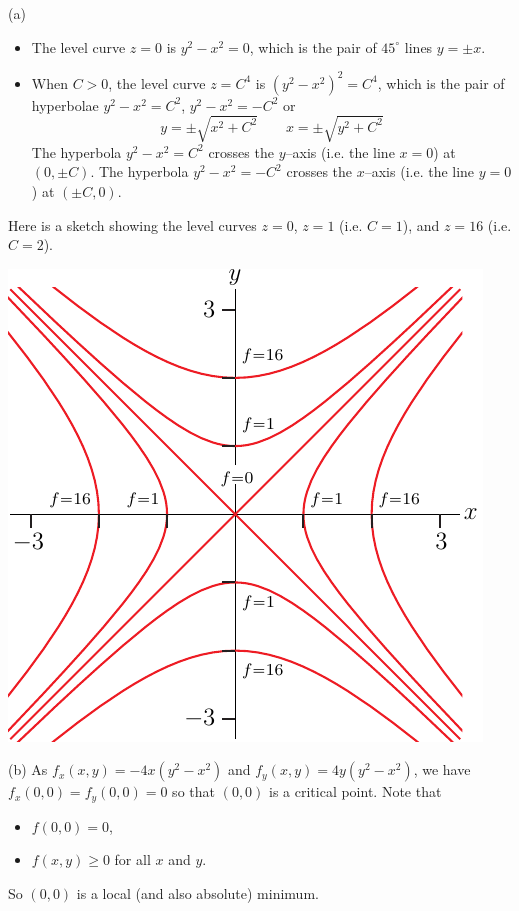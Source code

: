 \begin{solution}
(a) 
\begin{itemize}
\item 
The level curve $z=0$ is $y^2-x^2=0$, which is the pair
of $45^\circ$ lines $y=\pm x$. 
\item
When $C>0$, the level curve  
$z=C^4$ is ${(y^2-x^2)}^2=C^4$, which is the pair of hyperbolae 
$y^2-x^2=C^2$, $y^2-x^2=-C^2$ or 
\begin{equation*}
y=\pm\sqrt{x^2+C^2}\qquad x=\pm\sqrt{y^2+C^2}
\end{equation*}
The hyperbola  $y^2-x^2=C^2$ crosses the $y$--axis (i.e. the line $x=0$) 
at $(0,\pm C)$.
The hyperbola  $y^2-x^2=-C^2$ crosses the $x$--axis (i.e. the line $y=0$) 
at $(\pm C,0)$.
\end{itemize}
Here is a sketch showing the level curves $z=0$, $z=1$ (i.e. $C=1$),
and $z=16$ (i.e. $C=2$).

\begin{center}
     \includegraphics{fig/OE05D_5.pdf}
\end{center}

(b)
As $f_x(x,y)=-4x(y^2-x^2)$ and $f_y(x,y)=4y(y^2-x^2)$, we have 
$f_x(0,0) = f_y(0,0) = 0$ so that $(0,0)$ is a critical point. Note that 
\begin{itemize}
\item
$f(0,0)=0$, 
\item
$f(x,y)\ge 0$ for all $x$ and $y$.
\end{itemize}
So $(0,0)$ is a local (and also absolute) minimum.


\end{solution}
